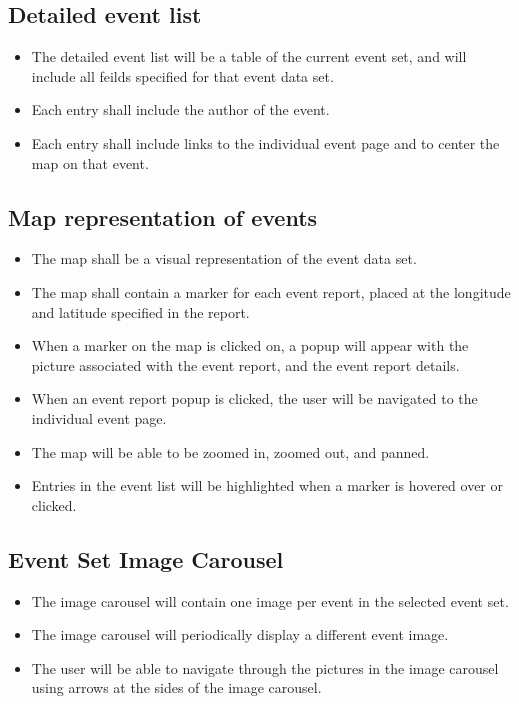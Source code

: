 \subsection{Detailed event list}
\begin{itemize}
\item The detailed event list will be a table of the current event set, and will include all feilds specified for that event data set.
\item Each entry shall include the author of the event.
\item Each entry shall include links to the individual event page and to center the map on that event.
\end{itemize}

\subsection{Map representation of events}
\begin{itemize}
\item The map shall be a visual representation of the event data set. 
\item The map shall contain a marker for each event report, placed at the longitude and latitude specified in the report.
\item When a marker on the map is clicked on, a popup will appear with the picture associated with the event report, and the event report details. 
\item When an event report popup is clicked, the user will be navigated to the individual event page.
\item The map will be able to be zoomed in, zoomed out, and panned.
\item Entries in the event list will be highlighted when a marker is hovered over or clicked.
\end{itemize}

\subsection{Event Set Image Carousel}
\begin{itemize}
\item The image carousel will contain one image per event in the selected event set.
\item The image carousel will periodically display a different event image.
\item The user will be able to navigate through the pictures in the image carousel using arrows at the sides of the image carousel.
\end{itemize}

